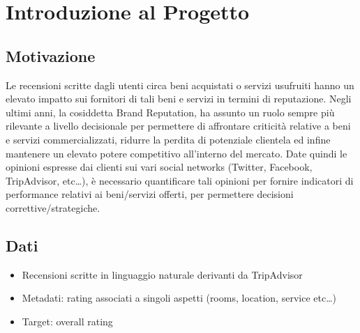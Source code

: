 \chapter{Introduzione al Progetto}
\section{Motivazione}
Le recensioni scritte dagli utenti circa beni acquistati o servizi usufruiti hanno un elevato impatto sui fornitori di tali beni e servizi in termini di reputazione. Negli ultimi anni, la cosiddetta Brand Reputation, ha assunto un ruolo sempre più rilevante a livello decisionale per permettere di affrontare criticità relative a beni  e servizi commercializzati, ridurre la perdita di potenziale clientela ed infine mantenere un elevato potere competitivo all’interno del mercato.  Date quindi le opinioni espresse dai clienti sui vari social networks (Twitter, Facebook, TripAdvisor, etc…), è necessario quantificare tali opinioni per fornire indicatori di performance relativi ai beni/servizi offerti, per permettere decisioni correttive/strategiche. 

\section{Dati}
\begin{itemize}
\item Recensioni scritte in linguaggio naturale derivanti da TripAdvisor
\item Metadati: rating associati a singoli aspetti (rooms, location, service etc…)
\item Target: overall rating 
\end{itemize}



